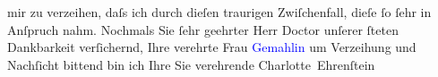                     mir zu verzeihen, daſs ich durch dieſen traurigen Zwiſchenfall, dieſe ſo ſehr in
                    Anſpruch nahm.\pend
           \pstart
           {\pb}Nochmals Sie ſehr geehrter Herr Doctor unſerer ſteten Dankbarkeit
                    verſichernd, Ihre verehrte Frau \textcolor{blue}{Gemahlin}{} um Verzeihung und Nachſicht bittend bin ich Ihre Sie
                    verehrende\pend
           \pstart \spacefill\mbox{Charlotte Ehrenſtein}\pend{}\endnumbering{}  
      